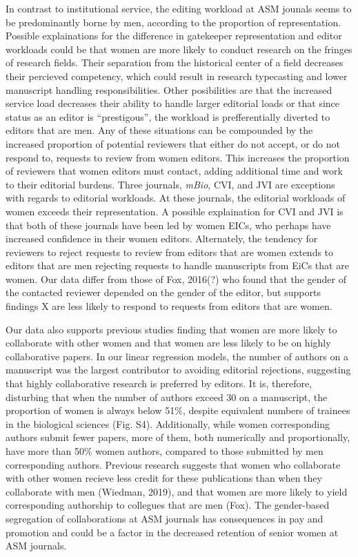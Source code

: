 \documentclass[11pt,]{article}
\begin{document}
In contrast to institutional service, the editing workload at ASM
jounals seems to be predominantly borne by men, according to the
proportion of representation. Possible explainations for the difference
in gatekeeper representation and editor workloads could be that women
are more likely to conduct research on the fringes of research fields.
Their separation from the historical center of a field decreases their
percieved competency, which could result in research typecasting and
lower manuscript handling responsibilities. Other posibilities are that
the increased service load decreases their ability to handle larger
editorial loads or that since status as an editor is ``prestigous'', the
workload is prefferentially diverted to editors that are men. Any of
these situations can be compounded by the increased proportion of
potential reviewers that either do not accept, or do not respond to,
requests to review from women editors. This increases the proportion of
reviewers that women editors must contact, adding additional time and
work to their editorial burdens. Three journals, \emph{mBio}, CVI, and
JVI are exceptions with regards to editorial workloads. At these
journals, the editorial workloads of women exceeds their representation.
A possible explaination for CVI and JVI is that both of these journals
have been led by women EICs, who perhaps have increased confidence in
their women editors. Alternately, the tendency for reviewers to reject
requests to review from editors that are women extends to editors that
are men rejecting requests to handle manuscripts from EiCs that are
women. Our data differ from those of Fox, 2016(?) who found that the
gender of the contacted reviewer depended on the gender of the editor,
but supports findings X are less likely to respond to requests from
editors that are women.

Our data also supports previous studies finding that women are more
likely to collaborate with other women and that women are less likely to
be on highly collaborative papers. In our linear regression models, the
number of authors on a manuscript was the largest contributor to
avoiding editorial rejections, suggesting that highly collaborative
research is preferred by editors. It is, therefore, disturbing that when
the number of authors exceed 30 on a manuscript, the proportion of women
is always below 51\%, despite equivalent numbers of trainees in the
biological sciences (Fig. S4). Additionally, while women corresponding
authors submit fewer papers, more of them, both numerically and
proportionally, have more than 50\% women authors, compared to those
submitted by men corresponding authors. Previous research suggests that
women who collaborate with other women recieve less credit for these
publications than when they collaborate with men (Wiedman, 2019), and
that women are more likely to yield corresponding authorship to
collegues that are men (Fox). The gender-based segregation of
collaborations at ASM journals has consequences in pay and promotion and
could be a factor in the decreased retention of senior women at ASM
journals.
\end{document}

